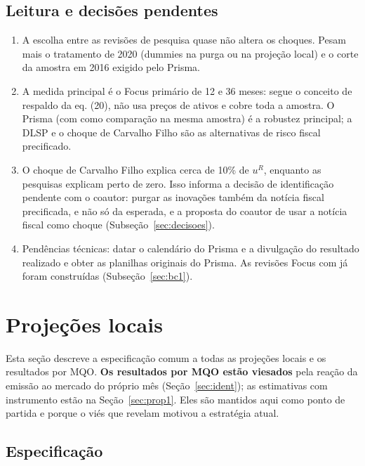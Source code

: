 \documentclass[12pt,a4paper]{article}
\begin{document}
\subsection{Leitura e decisões pendentes}\label{sec:purga_leitura}

\begin{enumerate}[leftmargin=1.2cm]
    \item A escolha entre as revisões de pesquisa quase não altera os choques. Pesam
    mais o tratamento de 2020 (dummies na purga ou na projeção local) e o corte da
    amostra em 2016 exigido pelo Prisma.
    \item A medida principal é o Focus primário de 12 e 36 meses: segue o conceito de
    respaldo da eq. (20), não usa preços de ativos e cobre toda a amostra. O Prisma
    (com  como comparação na mesma amostra) é a robustez principal; a
    DLSP e o choque de Carvalho Filho são as alternativas de risco fiscal precificado.
    \item O choque de Carvalho Filho explica cerca de 10\% de \(u^R\), enquanto as
    pesquisas explicam perto de zero. Isso informa a decisão de identificação pendente
    com o coautor: purgar as inovações também da notícia fiscal precificada, e não só
    da esperada, e a proposta do coautor de usar a notícia fiscal como choque
    (Subseção~\ref{sec:decisoes}).
    \item Pendências técnicas: datar o calendário do Prisma e a divulgação do
    resultado realizado e obter as planilhas originais do Prisma. As revisões Focus
    com  já foram construídas (Subseção~\ref{sec:bc1}).
\end{enumerate}

\section{Projeções locais}\label{sec:lp}

Esta seção descreve a especificação comum a todas as projeções locais e os
resultados por MQO. \textbf{Os resultados por MQO estão viesados} pela reação da
emissão ao mercado do próprio mês (Seção~\ref{sec:ident}); as estimativas com
instrumento estão na Seção~\ref{sec:prop1}. Eles são mantidos aqui como ponto de
partida e porque o viés que revelam motivou a estratégia atual.

\subsection{Especificação}
\end{document}
